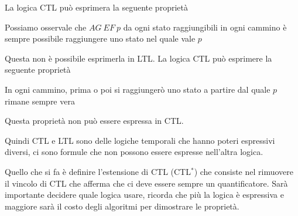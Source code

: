 \begin{osservazione}
    La logica CTL può esprimera la seguente proprietà
    \begin{center}
        Possiamo osservale che $AG \ EF \ p$ da ogni stato raggiungibili in ogni cammino
    è sempre possibile raggiungere uno stato nel quale vale $p$
    \end{center}
    Questa non è possibile esprimerla in LTL.
    La logica CTL può esprimere la seguente proprietà
    \begin{center}
        In ogni cammino, prima o poi si raggiungerò uno stato a partire dal quale $p$
        rimane sempre vera
    \end{center}
    Questa proprietà non può essere espressa in CTL.
\end{osservazione}
Quindi CTL e LTL sono delle logiche temporali che hanno poteri espressivi diversi,
ci sono formule che non possono essere espresse nell'altra logica.

Quello che si fa è definire l'estensione di CTL (CTL$^\ast$) che consiste nel rimuovere il vincolo
di CTL che afferma che ci deve essere sempre un quantificatore. Sarà importante
decidere quale logica usare, ricorda che più la logica è espressiva e maggiore sarà 
il costo degli algoritmi per dimostrare le proprietà.

